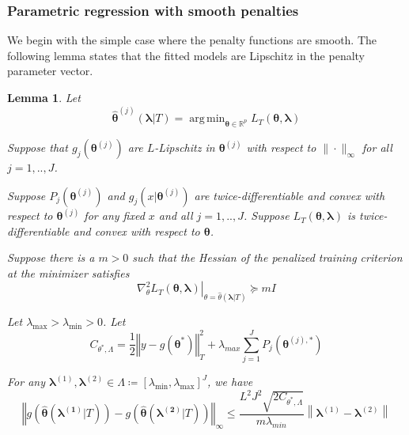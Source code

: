 \documentclass[12pt]{article}
\newtheorem{lemma}{Lemma}
\DeclareMathOperator*{\argmin}{arg\,min}
\begin{document}

\subsubsection{Parametric regression with smooth penalties}
We begin with the simple case where the penalty functions are smooth. The following lemma states that the fitted models are Lipschitz in the penalty parameter vector.
\begin{lemma}
	\label{lemma:param_add}
	Let 
	\begin{equation}
	\label{eq:param_add_estimator}
	\hat{\boldsymbol{\theta}}^{(j)}\left (\boldsymbol{\lambda} | T \right )  = 
	\argmin_{\boldsymbol{\theta} \in \mathbb{R}^p} L_T \left (\boldsymbol{\theta}, \boldsymbol{\lambda} \right)
	\end{equation}
	
	Suppose that $g_j(\boldsymbol{\theta}^{(j)})$ are $L$-Lipschitz in $\boldsymbol{\theta}^{(j)}$ with respect to $\| \cdot \|_\infty$ for all $j=1,..,J$.
	
	Suppose $P_j(\boldsymbol{\theta}^{(j)})$ and $g_j(x | \boldsymbol{\theta}^{(j)})$ are twice-differentiable and convex with respect to $\boldsymbol{\theta}^{(j)}$ for any fixed $x$ and all $j=1,..,J$. Suppose $L_T \left (\boldsymbol{\theta}, \boldsymbol{\lambda} \right)$ is twice-differentiable and convex with respect to $\boldsymbol{\theta}$.
	
	Suppose there is a $m > 0$ such that the Hessian of the penalized training criterion at the minimizer satisfies 
	\begin{equation}
	\left . \nabla_{\theta}^2 L_T \left (\boldsymbol{\theta}, \boldsymbol{\lambda} \right) \right |_{\theta = \hat{\theta}(\boldsymbol{\lambda} | T )} \succeq mI
	\end{equation}
	
	Let $\lambda_{\max} > \lambda_{\min} > 0 $. Let
	\begin{equation}
	C_{\theta^{*},\Lambda}=
	\frac{1}{2}\left\Vert y- g(\boldsymbol{\theta}^{*})\right\Vert _{T}^{2}
	+\lambda_{max}\sum_{j=1}^{J} P_{j}(\boldsymbol{\theta}^{(j),*})
	\end{equation}
	
	For any $\boldsymbol{\lambda}^{(1)}, \boldsymbol{\lambda}^{(2)} \in \Lambda \coloneqq \left [ \lambda_{\min}, \lambda_{\max} \right ]^J$, we have
	\begin{equation}
	\label{eq:param_add_lipschitz}
	\left\Vert g\left(\hat{\boldsymbol{\theta}}(\boldsymbol{\lambda^{(1)}} | T)\right)-
	g\left(\hat{\boldsymbol{\theta}}(\boldsymbol{\lambda^{(2)}}| T)\right)\right\Vert _{\infty}
	\le
	\frac{L^{2}J^{2}\sqrt{2C_{\theta^{*},\Lambda}}}{m \lambda_{min}}
	\left \|\boldsymbol{\lambda}^{(1)}-\boldsymbol{\lambda}^{(2)} \right \|
	\end{equation}
\end{lemma}
\end{document}
